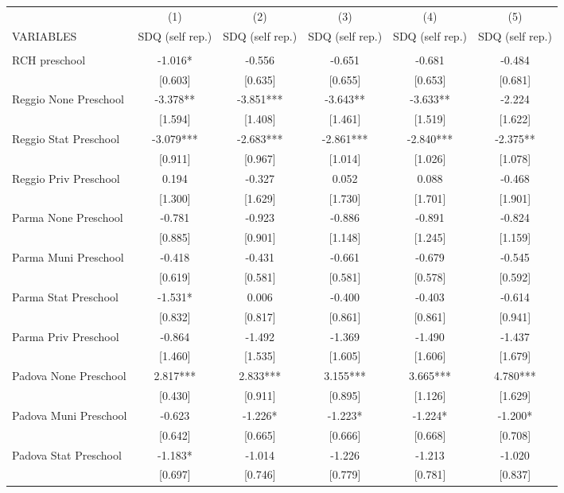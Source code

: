 \begin{tabular}{lccccc} \hline
 & (1) & (2) & (3) & (4) & (5) \\
VARIABLES & SDQ (self rep.) & SDQ (self rep.) & SDQ (self rep.) & SDQ (self rep.) & SDQ (self rep.) \\ \hline
 &  &  &  &  &  \\
RCH preschool & -1.016* & -0.556 & -0.651 & -0.681 & -0.484 \\
 & [0.603] & [0.635] & [0.655] & [0.653] & [0.681] \\
Reggio None Preschool & -3.378** & -3.851*** & -3.643** & -3.633** & -2.224 \\
 & [1.594] & [1.408] & [1.461] & [1.519] & [1.622] \\
Reggio Stat Preschool & -3.079*** & -2.683*** & -2.861*** & -2.840*** & -2.375** \\
 & [0.911] & [0.967] & [1.014] & [1.026] & [1.078] \\
Reggio Priv Preschool & 0.194 & -0.327 & 0.052 & 0.088 & -0.468 \\
 & [1.300] & [1.629] & [1.730] & [1.701] & [1.901] \\
Parma None Preschool & -0.781 & -0.923 & -0.886 & -0.891 & -0.824 \\
 & [0.885] & [0.901] & [1.148] & [1.245] & [1.159] \\
Parma Muni Preschool & -0.418 & -0.431 & -0.661 & -0.679 & -0.545 \\
 & [0.619] & [0.581] & [0.581] & [0.578] & [0.592] \\
Parma Stat Preschool & -1.531* & 0.006 & -0.400 & -0.403 & -0.614 \\
 & [0.832] & [0.817] & [0.861] & [0.861] & [0.941] \\
Parma Priv Preschool & -0.864 & -1.492 & -1.369 & -1.490 & -1.437 \\
 & [1.460] & [1.535] & [1.605] & [1.606] & [1.679] \\
Padova None Preschool & 2.817*** & 2.833*** & 3.155*** & 3.665*** & 4.780*** \\
 & [0.430] & [0.911] & [0.895] & [1.126] & [1.629] \\
Padova Muni Preschool & -0.623 & -1.226* & -1.223* & -1.224* & -1.200* \\
 & [0.642] & [0.665] & [0.666] & [0.668] & [0.708] \\
Padova Stat Preschool & -1.183* & -1.014 & -1.226 & -1.213 & -1.020 \\
 & [0.697] & [0.746] & [0.779] & [0.781] & [0.837] \\

\end{tabular}

